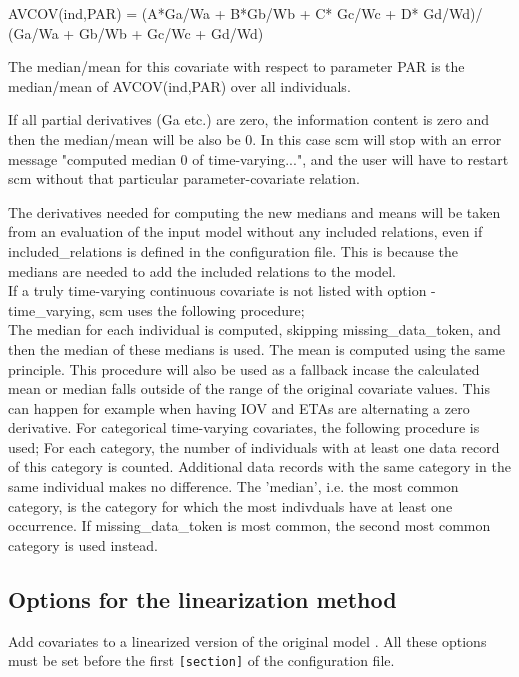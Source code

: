 \begin{optionlist}
AVCOV(ind,PAR) = (A*Ga/Wa + B*Gb/Wb + C* Gc/Wc + D* Gd/Wd)/
(Ga/Wa + Gb/Wb + Gc/Wc + Gd/Wd)
	
The median/mean for this covariate with respect to parameter PAR is the median/mean of AVCOV(ind,PAR) over all individuals.
	
If all partial derivatives (Ga etc.) are zero, the information content is zero and then the median/mean will be also be 0.
In this case scm will stop with an error message "computed median 0 of time-varying...", and the user will have to restart scm without that particular parameter-covariate relation.
	
The derivatives needed for computing the new medians and means will be taken from an evaluation of the input model without any included relations, even if included\_relations is defined in the configuration file. This is because the medians are needed to add the included relations to the model.\\
	
If a truly time-varying continuous covariate is not listed with option -time\_varying, scm uses the following procedure;\\
The median for each individual is computed, skipping missing\_data\_token, and then the median of these medians is used. The mean is computed using the same principle. This procedure will also be used as a fallback incase the calculated mean or median falls outside of the range of the original covariate values. This can happen for example when having IOV and ETAs are alternating a zero derivative. For categorical time-varying covariates, the following procedure is used;
For each category, the number of individuals with at least one data record of this category is counted. Additional data records with the same category in the same individual makes no difference. The 'median', i.e. the most common category, is the category for which the most indivduals have at least one occurrence. If missing\_data\_token is most common, the second most common category is used instead.
\nextopt
\end{optionlist}

\subsection{Options for the linearization method}

Add covariates to a linearized version of the  original model \cite{Khandelwal}. All these options must be set before the first \verb|[section]| of the configuration file. 

